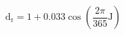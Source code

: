 \documentclass[12pt]{article}
\begin{document}
\begin{displaymath}
\mathrm{d}_{\mathrm{r}}=1+0.033 \cos \left(\frac{2 \pi}{365} \mathrm{J}\right)
\end{displaymath}
\end{document}
